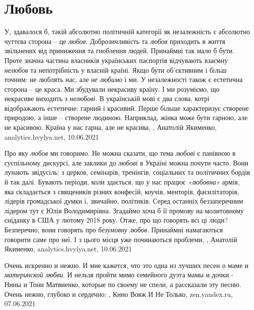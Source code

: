  
 
 
 
 
\chapter{Любовь}
\label{sec:slova.ljubov}

У, здавалося б, такій абсолютно політичній категорії як незалежність є
абсолютно чуттєва сторона – це \emph{любов}. Доброзичливість та \emph{любов}
приходить в життя звільнених від приниження та гноблення людей. Принаймні так
мало б бути.  Проте значна частина власників українських паспортів відчувають
взаємну \emph{нелюбов} та непотрібність у власній країні. Якщо бути об’єктивним
і більш точним: не люблять нас, але \emph{не любимо} і ми.  У незалежності
також є естетична сторона – це краса. Ми збудували некрасиву країну. І ми
розуміємо, що некрасиве виходить з \emph{нелюбові}. В українській мові є два
слова, котрі відображають естетичне: гарний і красивий. Перше більше
характеризує створене природою, а інше – створене людиною. Наприклад, жінка
може бути гарною, але не красивою. Країна у нас гарна, але не красива,
, Анатолій Якименко, analytics.hvylya.net, 10.06.2021

Про яку \emph{любов} ми говоримо. Не можна сказати, що тема \emph{любові} є
панівною в суспільному дискурсі, але заклики до \emph{любові} в Україні можна
почути часто. Вони лунають звідусіль: з церков, семінарів, тренінгів,
соціальних та політичних бордів й так далі. Бувають періоди, коли здається, що
у нас працює \emph{«любовна»} армія, яка складається з священиків різних
конфесій, коучів, менторів, фасилітаторів, лідерів громадської думки і,
звичайно, політиків. Серед останніх беззаперечним лідером тут є Юлія
Володимирівна. Згадаймо хоча б її промову на молитовному сніданку в США у
лютому 2018 року.  Отже, про що говорять всі ці люди? Безперечно, вони говорять
про \emph{безумовну любов}. Принаймні намагаються говорити саме про неї. І з
цього місця уже починаються проблеми, 
, Анатолій Якименко, analytics.hvylya.net, 10.06.2021

Очень искренно и нежно. И мне кажется, что это одна из лучших песен о маме и
\emph{материнской любви}. И нельзя пройти мимо семейного дуэта мамы и дочки - Нины и
Тони Матвиенко, которые по своему не спели, а рассказали эту песню. Очень
нежно, глубоко и сердечно:
, 
Кино Вояж И Не Только, zen.yandex.ru, 07.06.2021

